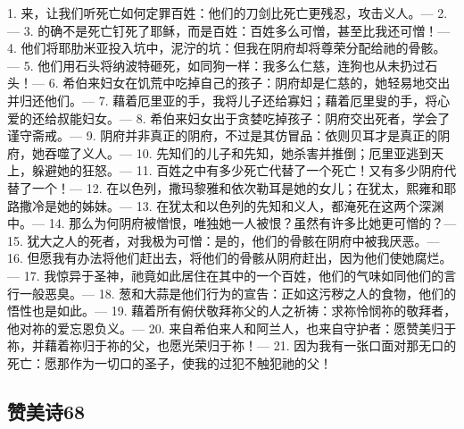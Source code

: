 1. 来，让我们听死亡如何定罪百姓：他们的刀剑比死亡更残忍，攻击义人。— 2. — 3. 的确不是死亡钉死了耶稣，而是百姓：百姓多么可憎，甚至比我还可憎！— 4. 他们将耶肋米亚投入坑中，泥泞的坑：但我在阴府却将尊荣分配给祂的骨骸。— 5. 他们用石头将纳波特砸死，如同狗一样：我多么仁慈，连狗也从未扔过石头！— 6. 希伯来妇女在饥荒中吃掉自己的孩子：阴府却是仁慈的，她轻易地交出并归还他们。— 7. 藉着厄里亚的手，我将儿子还给寡妇；藉着厄里叟的手，将心爱的还给叔能妇女。— 8. 希伯来妇女出于贪婪吃掉孩子：阴府交出死者，学会了谨守斋戒。— 9. 阴府并非真正的阴府，不过是其仿冒品：依则贝耳才是真正的阴府，她吞噬了义人。— 10. 先知们的儿子和先知，她杀害并推倒；厄里亚逃到天上，躲避她的狂怒。— 11. 百姓之中有多少死亡代替了一个死亡！又有多少阴府代替了一个！— 12. 在以色列，撒玛黎雅和依次勒耳是她的女儿；在犹太，熙雍和耶路撒冷是她的姊妹。— 13. 在犹太和以色列的先知和义人，都淹死在这两个深渊中。— 14. 那么为何阴府被憎恨，唯独她一人被恨？虽然有许多比她更可憎的？— 15. 犹大之人的死者，对我极为可憎：是的，他们的骨骸在阴府中被我厌恶。— 16. 但愿我有办法将他们赶出去，将他们的骨骸从阴府赶出，因为他们使她腐烂。— 17. 我惊异于圣神，祂竟如此居住在其中的一个百姓，他们的气味如同他们的言行一般恶臭。— 18. 葱和大蒜是他们行为的宣告：正如这污秽之人的食物，他们的悟性也是如此。— 19. 藉着所有俯伏敬拜祢父的人之祈祷：求祢怜悯祢的敬拜者，他对祢的爱忘恩负义。— 20. 来自希伯来人和阿兰人，也来自守护者：愿赞美归于祢，并藉着祢归于祢的父，也愿光荣归于祢！— 21. 因为我有一张口面对那无口的死亡：愿那作为一切口的圣子，使我的过犯不触犯祂的父！\par


\subsection{赞美诗68}

